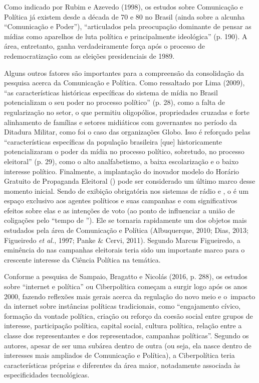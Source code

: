 Como indicado por Rubim e Azevedo (1998), os estudos sobre Comunicação e
Política já existem desde a década de 70 e 80 no Brasil (ainda sobre a
alcunha ``Comunicação e Poder''), ``articulados pela preocupação
dominante de pensar as mídias como aparelhos de luta política e
principalmente ideológica'' (p. 190). A área, entretanto, ganha
verdadeiramente força após o processo de redemocratização com as
eleições presidenciais de 1989.

Alguns outros fatores são importantes para a compreensão da consolidação
da pesquisa acerca da Comunicação e Política. Como ressaltado por Lima
(2009), ``as características históricas específicas do sistema de mídia
no Brasil potencializam o seu poder no processo político'' (p. 28), como
a falta de regularização no setor, o que permitiu oligopólios,
propriedades cruzadas e forte alinhamento de famílias e setores
midiáticos com governantes no período da Ditadura Militar, como foi o
caso das organizações Globo. Isso é reforçado pelas ``características
específicas da população brasileira {[}que{]} historicamente
potencializaram o poder da mídia no processo político, sobretudo, no
processo eleitoral'' (p. 29), como o alto analfabetismo, a baixa
escolarização e o baixo interesse político. Finalmente, a implantação do
inovador modelo do Horário Gratuito de Propaganda Eleitoral () pode
ser considerado um último marco desse momento inicial. Sendo de exibição
obrigatória nos sistemas de rádio e , o  é um espaço exclusivo aos
agentes políticos e suas campanhas e com significativos efeitos sobre
elas e as intenções de voto (ao ponto de influenciar a união de
coligações pelo ``tempo de ''). Ele se tornaria rapidamente um dos
objetos mais estudados pela área de Comunicação e Política (Albuquerque,
2010; Dias, 2013; Figueiredo \emph{et al.}, 1997; Panke \& Cervi, 2011).
Segundo Marcus Figueiredo, a eminência do  nas campanhas eleitorais
teria sido um importante marco para o crescente interesse da Ciência
Política na temática.

Conforme a pesquisa de Sampaio, Bragatto e Nicolás (2016, p. 288), os
estudos sobre ``internet e política'' ou Ciberpolítica começam a surgir
logo após os anos 2000, fazendo reflexões mais gerais acerca da
regulação do novo meio e o~impacto da internet sobre instâncias
políticas tradicionais, como ``engajamento cívico, formação da vontade
política, criação ou reforço da coesão social entre grupos de interesse,
participação política, capital social, cultura política, relação entre a
classe dos representantes e dos representados, campanhas políticas''.
Segundo os autores, apesar de ser uma subárea dentro de outra (ou seja,
ela nasce dentro de interesses mais ampliados de Comunicação e
Política), a Ciberpolítica teria características próprias e diferentes
da área maior, notadamente associada às especificidades tecnológicas.


